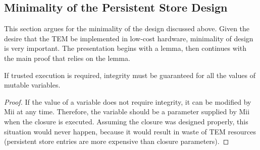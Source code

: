 \subsection{Minimality of the Persistent Store
Design}\label{concepts:pstore_minimal}
This section argues for the minimality of the design discussed above. Given the
desire that the TEM be implemented in low-cost hardware, minimality of design is
very important. The presentation begins with a lemma, then continues with the
main proof that relies on the lemma.


\begin{lemma*}
If trusted execution is required, integrity must be guaranteed for all the
values of mutable variables.
\end{lemma*}
\begin{proof}
If the value of a variable does not require integrity, it can be
modified by Mii at any time. Therefore, the variable should be a parameter
supplied by Mii when the closure is executed. Assuming the closure
was designed properly, this situation would never happen, because it would
result in waste of TEM resources (persistent store entries are more expensive
than closure parameters).
\end{proof}

